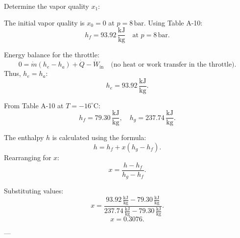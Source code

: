 Determine the vapor quality \( x_1 \):  

The initial vapor quality is \( x_0 = 0 \) at \( p = 8 \, \text{bar} \). Using Table A-10:  
\[
h_f = 93.92 \, \frac{\text{kJ}}{\text{kg}} \quad \text{at } p = 8 \, \text{bar}.
\]  

Energy balance for the throttle:  
\[
0 = \dot{m} (h_e - h_a) + \dot{Q} - \dot{W}_{\text{in}} \quad \text{(no heat or work transfer in the throttle)}.
\]  
Thus, \( h_e = h_a \):  
\[
h_e = 93.92 \, \frac{\text{kJ}}{\text{kg}}.
\]  

From Table A-10 at \( T = -16^\circ\text{C} \):  
\[
h_f = 79.30 \, \frac{\text{kJ}}{\text{kg}}, \quad h_g = 237.74 \, \frac{\text{kJ}}{\text{kg}}.
\]  

The enthalpy \( h \) is calculated using the formula:  
\[
h = h_f + x (h_g - h_f).
\]  
Rearranging for \( x \):  
\[
x = \frac{h - h_f}{h_g - h_f}.
\]  

Substituting values:  
\[
x = \frac{93.92 \, \frac{\text{kJ}}{\text{kg}} - 79.30 \, \frac{\text{kJ}}{\text{kg}}}{237.74 \, \frac{\text{kJ}}{\text{kg}} - 79.30 \, \frac{\text{kJ}}{\text{kg}}}.
\]  
\[
x = 0.3076.
\]  

---